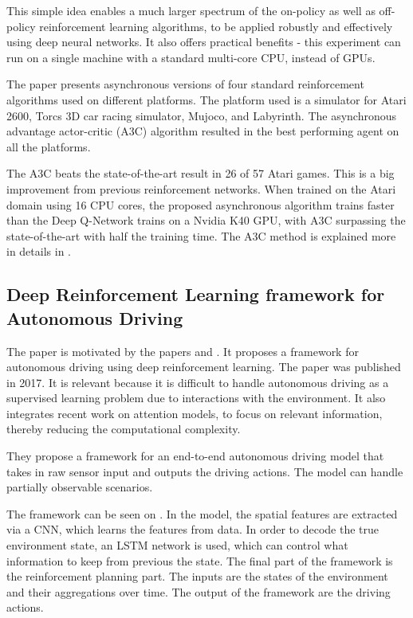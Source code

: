 This simple idea enables a much larger spectrum of the on-policy as well as off-policy reinforcement learning algorithms, to be applied robustly and effectively using deep neural networks. It also offers practical benefits - this experiment can run on a single machine with a standard multi-core CPU, instead of GPUs.

The paper presents asynchronous versions of four standard reinforcement algorithms used on different platforms. The platform used is a simulator for Atari 2600, Torcs 3D car racing simulator, Mujoco, and Labyrinth. The asynchronous advantage actor-critic (A3C) algorithm resulted in the best performing agent on all the platforms.

The A3C beats the state-of-the-art result in 26 of 57 Atari games. This is a big improvement from previous reinforcement networks. When trained on the Atari domain using 16 CPU cores, the proposed asynchronous algorithm trains faster than the Deep Q-Network trains on a Nvidia K40 GPU, with A3C surpassing the state-of-the-art with half the training time. The A3C method is explained more in details in .
   
\subsection{Deep Reinforcement Learning framework for Autonomous Driving} 
The paper \cite{Sallab:2017:2470-1173:70} is motivated by the papers \cite{DBLP:journals/corr/MnihKSGAWR13} and \cite{Silver_2016}. It proposes a framework for autonomous driving using deep reinforcement learning. The paper was published in 2017. It is relevant because it is difficult to handle autonomous driving as a supervised learning problem due to interactions with the environment. It also integrates recent work on attention models, to focus on relevant information, thereby reducing the computational complexity.

They propose a framework for an end-to-end autonomous driving model that takes in raw sensor input and outputs the driving actions. The model can handle partially observable scenarios.  

The framework can be seen on . In the model, the spatial features are extracted via a CNN, which learns the features from data. In order to decode the true environment state, an LSTM network is used, which can control what information to keep from previous the state. The final part of the framework is the reinforcement planning part. The inputs are the states of the environment and their aggregations over time. The output of the framework are the driving actions.  

